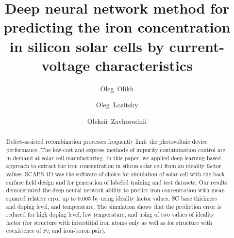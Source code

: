 \documentclass[a4paper,fleqn]{cas-sc}
\begin{document}
\def\floatpagepagefraction{1}
\def\textpagefraction{.001}

\title [mode = title]{Deep neural network method for predicting the iron concentration in silicon solar cells by current-voltage characteristics}


\author[1]{Oleg~Olikh}
\cormark[1]


\address[1]{Taras Shevchenko National University of Kyiv, 64/13, Volodymyrska Street, City of Kyiv, Ukraine, 01601}

\author[1]{Oleg~Lozitsky}


\author[1]{Oleksii~Zavhorodnii}




\begin{abstract}
Defect-assisted recombination processes frequently
limit the photovoltaic device performance.
The low-cost and express methods of impurity contamination control
are in demand at solar cell manufacturing.
In this paper, we applied deep learning-based
approach to extract the iron concentration in silicon solar cell from an
ideality factor values.
SCAPS-1D was the software of choice for simulation of solar cell with the back surface field design
and for generation of labeled training and test datasets.
Our results demonstrated the deep neural network ability
to predict iron concentration with mean squared relative error up to 0.005 by using ideality factor values, SC base thickness and doping level, and temperature.
The simulation shows that the prediction error
is reduced for high doping level, low temperature, and using of two values of ideality factor (for structure with interstitial iron atoms only as well as for structure with
coexistence of Fe\textsubscript{i} and iron-boron pair).

\end{abstract}

\end{document}
